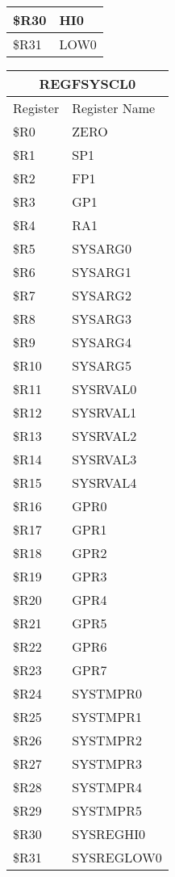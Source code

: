 \documentclass[letterpaper, 11pt]{article}
\begin{document}
\begin{figure}[!h]
{\begin{tabular}{|l|l|}
			\$R30 & HI0  \\ \hline
			\$R31 & LOW0  \\ \hline
		\end{tabular}
	}
	\hfill
	\parbox{0.5\linewidth}{
		\centering\fontsize{6}{8}\selectfont
		\fontsize{6}{8}\selectfont
		\begin{tabular}{|l|l|}
			\hline
			\multicolumn{2}{|c|}{REGFSYSCL0} \\
			\hline
			Register & Register Name \\ \hline
			\$R0  & ZERO \\ 	\hline
			\$R1  & SP1 \\ 	\hline
			\$R2  & FP1 \\ 	\hline
			\$R3  & GP1 \\ 	\hline
			\$R4  & RA1 \\ 	\hline
			\$R5  & SYSARG0 \\ 	\hline
			\$R6  & SYSARG1 \\ 	\hline
			\$R7  & SYSARG2 \\ 	\hline
			\$R8  & SYSARG3 \\ 	\hline
			\$R9  & SYSARG4 \\ 	\hline
			\$R10 & SYSARG5 \\ \hline
			\$R11 & SYSRVAL0  \\ \hline
			\$R12 & SYSRVAL1  \\ \hline
			\$R13 & SYSRVAL2  \\ \hline
			\$R14 & SYSRVAL3  \\ \hline
			\$R15 & SYSRVAL4  \\ \hline
			\$R16 & GPR0  \\ \hline
			\$R17 & GPR1  \\ \hline
			\$R18 & GPR2  \\ \hline
			\$R19 & GPR3  \\ \hline
			\$R20 & GPR4  \\ \hline
			\$R21 & GPR5  \\ \hline
			\$R22 & GPR6  \\ \hline
			\$R23 & GPR7  \\ \hline
			\$R24 & SYSTMPR0  \\ \hline
			\$R25 & SYSTMPR1  \\ \hline
			\$R26 & SYSTMPR2  \\ \hline
			\$R27 & SYSTMPR3  \\ \hline
			\$R28 & SYSTMPR4  \\ \hline
			\$R29 & SYSTMPR5  \\ \hline
			\$R30 & SYSREGHI0  \\ \hline
			\$R31 & SYSREGLOW0  \\ \hline
		\end{tabular}
	}
\end{figure}
\end{document}
